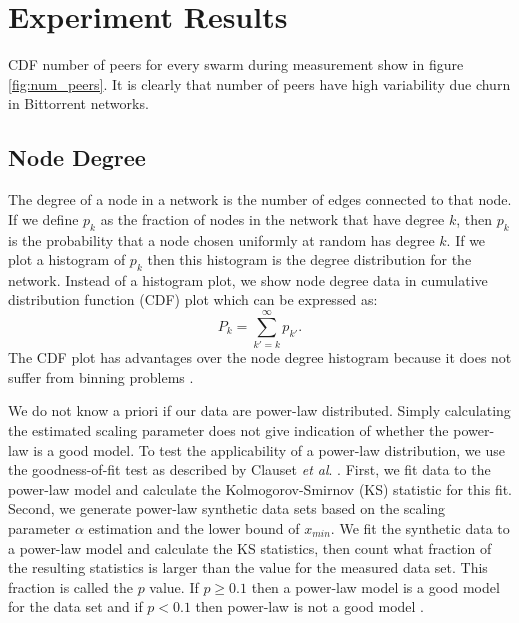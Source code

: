 \documentclass[10pt,conference,letterpaper]{IEEEtran}
\begin{document}
\section{Experiment Results}\label{result}
CDF number of peers for every swarm during measurement show in figure \ref{fig:num_peers}. 
It is clearly that number of peers have high variability due churn in Bittorrent networks. 

\subsection{Node Degree}
The degree of a node in a network is the number of edges connected to that node. 
If we define $p_k$ as the  fraction of nodes in the network that have degree $k$, then $p_k$ is the probability that a node chosen uniformly at random has degree $k$. 
If we plot a histogram of $p_k$ then this histogram is the degree distribution for  the network. 
Instead of a histogram plot,  we show node degree data in cumulative distribution  function (CDF) plot which can be expressed as:
\begin{equation}
P_k = \sum_{k'=k}^{\infty} p_{k'}.
\end{equation}
The CDF plot has advantages over the node degree histogram because it does not suffer from binning problems  \cite{newman2003structure}.

We do not know a priori if our data are power-law distributed. 
Simply calculating the estimated scaling parameter does not give indication of  whether the power-law is a good model.  
To test the applicability of a power-law distribution, we use the goodness-of-fit test as described by Clauset \textit{et al}. \cite{clauset2009power}. 
First, we fit data to the power-law model and calculate the Kolmogorov-Smirnov (KS) statistic for this fit. 
Second, we generate power-law synthetic data sets based on the scaling parameter $\alpha$ estimation and the lower bound of $x_{min}$. 
We fit the synthetic data to a power-law model and calculate the KS statistics, then count what fraction of the resulting statistics is larger than the value for the measured data set. 
This fraction is called the $p$ value.  
If $p \geq 0.1$ then a power-law model is a good model for the data set and if $p < 0.1$ then power-law is not a good model \cite{clauset2009power}.
\end{document}
